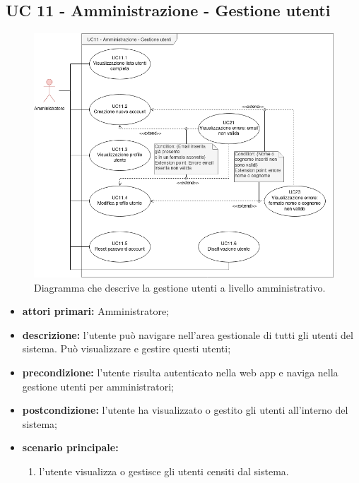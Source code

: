 \subsection{UC 11 - Amministrazione - Gestione utenti}

		\begin{figure}[H]
			\centering
			\includegraphics[scale=0.60]{res/images/uc11}
			\caption{Diagramma che descrive la gestione utenti a livello amministrativo.}
		\end{figure}

		\begin{itemize}
			\item \textbf{attori primari:} Amministratore;
			\item \textbf{descrizione:} l'utente può navigare nell'area gestionale di tutti gli utenti del sistema. Può visualizzare e gestire questi utenti;
			\item \textbf{precondizione:} l'utente risulta autenticato nella web app e naviga nella gestione utenti per amministratori;
			\item \textbf{postcondizione:} l'utente ha visualizzato o gestito gli utenti all'interno del sistema;
			\item \textbf{scenario principale:}
			\begin{enumerate}
				\item{l'utente visualizza o gestisce gli utenti censiti dal sistema.}
			\end{enumerate}	
		\end{itemize}

